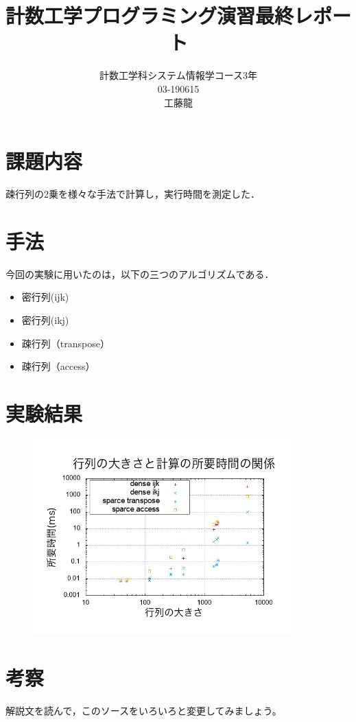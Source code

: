 \documentclass{jsarticle}
\begin{document}
\title{計数工学プログラミング演習最終レポート}
\author{計数工学科システム情報学コース3年\\03-190615\\工藤龍}
\maketitle

\section{課題内容}

疎行列の2乗を様々な手法で計算し，実行時間を測定した．

\section{手法}

今回の実験に用いたのは，以下の三つのアルゴリズムである．
\begin{itemize}
\item 密行列(ijk)
\item 密行列(ikj)
\item 疎行列（transpose）
\item 疎行列（access）
\end{itemize}


\section{実験結果}

\begin{figure}[H]
  \begin{center}
  \includegraphics[width=10cm]{../graph.png}
  \end{center}
\end{figure}


\section{考察}

解説文を読んで，このソースをいろいろと変更してみましょう。
\end{document}
